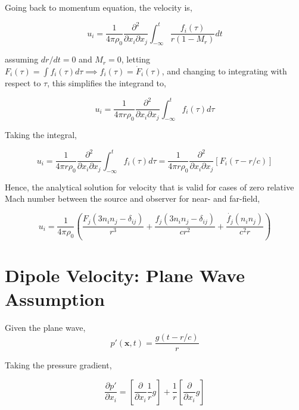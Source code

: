 Going back to momentum equation, the velocity is,

\begin{equation*}
    u_i = \frac{1}{4\pi\rho_0} \frac{\partial^2}{\partial x_i \partial x_j} \int_{-\infty}^t \frac{f_i(\tau)}{r(1-M_r)}dt
\end{equation*}

assuming $dr/dt=0$ and $M_r=0$, letting $F_i(\tau) = \int f_i(\tau) d\tau \implies f_i(\tau) = \dot{F}_i(\tau)$, and changing to integrating with respect to $\tau$, this simplifies the integrand to,

\begin{equation*}
    u_i = \frac{1}{4\pi r\rho_0} \frac{\partial^2}{\partial x_i \partial x_j} \int_{-\infty}^t {f_i(\tau)}d\tau
\end{equation*}

Taking the integral,

\begin{equation*}
    u_i = \frac{1}{4\pi r\rho_0} \frac{\partial^2}{\partial x_i \partial x_j} \int_{-\infty}^t {f_i(\tau)}d\tau
    =
    \frac{1}{4\pi r\rho_0} \frac{\partial^2}{\partial x_i \partial x_j} \left[F_i(\tau-r/c)
    \right]
\end{equation*}

Hence, the analytical solution for velocity that is valid for cases of zero relative Mach number between the source and observer for near- and far-field,

\begin{equation}
    u_i=\frac{1}{4\pi\rho_0} \left( 
    \frac{F_j(3n_in_j-\delta_{ij})}{r^3} +
    \frac{f_j(3n_in_j - \delta_{ij})}{cr^2} +
    \frac{\dot{f_j}(n_in_j)}{c^2r}
    \right)
\end{equation}

\chapter{Dipole Velocity: Plane Wave Assumption} \label{app:planeWave}

Given the plane wave,
\begin{equation}
    p'(\bm{x},t)=\frac{g(t-r/c)}{r}
    \label{eq:plane_wave_def}
\end{equation}

Taking the pressure gradient,

\begin{equation*}
    \frac{\partial p'}{\partial x_i} = 
    \left[\frac{\partial}{\partial x_i}\frac{1}{r}g \right] +
    \frac{1}{r} \left[ \frac{\partial}{\partial x_i}g 
    \right]
\end{equation*}

